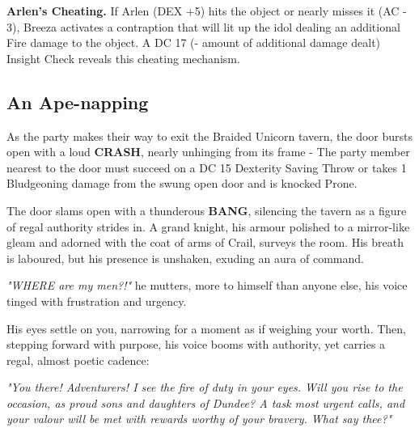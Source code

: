 {\entryfont \noindent\textbf{Arlen's Cheating.} If Arlen (DEX +5) hits the object or nearly misses it (AC - 3), Breeza activates a contraption that will lit up the idol dealing an additional  Fire damage to the object. A DC 17 (- amount of additional damage dealt) Insight Check reveals this cheating mechanism. }

\subsection*{An Ape-napping}
{\entryfont As the party makes their way to exit the Braided Unicorn tavern, the door bursts open with a loud \textbf{CRASH}, nearly unhinging from its frame - The party member nearest to the door must succeed on a DC 15 Dexterity Saving Throw or takes 1 Bludgeoning damage from the swung open door and is knocked Prone.}

\begin{DndReadAloud}
	The door slams open with a thunderous \textbf{BANG}, silencing the tavern as a figure of regal authority strides in. A grand knight, his armour polished to a mirror-like gleam and adorned with the coat of arms of Crail, surveys the room. His breath is laboured, but his presence is unshaken, exuding an aura of command.

	\textit{"WHERE are my men?!"} he mutters, more to himself than anyone else, his voice tinged with frustration and urgency.

	His eyes settle on you, narrowing for a moment as if weighing your worth. Then, stepping forward with purpose, his voice booms with authority, yet carries a regal, almost poetic cadence:

	\textit{"You there! Adventurers! I see the fire of duty in your eyes. Will you rise to the occasion, as proud sons and daughters of Dundee? A task most urgent calls, and your valour will be met with rewards worthy of your bravery. What say thee?"}
\end{DndReadAloud}

